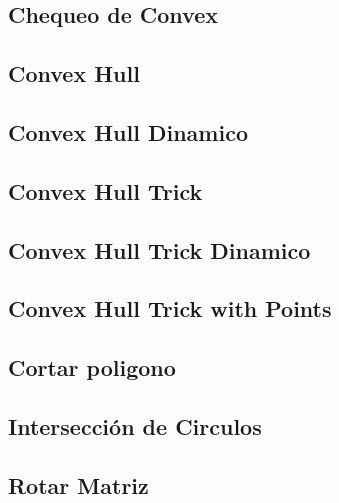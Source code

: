 \subsection{Chequeo de Convex}


\subsection{Convex Hull}


\subsection{Convex Hull Dinamico}


\newpage
\subsection{Convex Hull Trick}


\subsection{Convex Hull Trick Dinamico}


\subsection{Convex Hull Trick with Points}


\subsection{Cortar poligono}


\subsection{Intersecci\'on de Circulos}


\subsection{Rotar Matriz}


